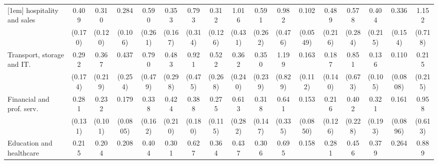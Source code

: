 {\begin{tabular}{l*{16}{c}}
[1em]
hospitality and sales&       0.409\sym{*}  &       0.310\sym{**} &       0.284\sym{***}&       0.590         &       0.353\sym{*}  &       0.793         &       0.312\sym{**} &       1.016         &       0.591         &       0.982         &       0.102\sym{***}&       0.489         &       0.578         &       0.404         &       0.336\sym{*}  &       1.152         \\
                    &     (0.170)         &     (0.120)         &     (0.106)         &     (0.261)         &     (0.167)         &     (0.314)         &     (0.126)         &     (0.431)         &     (0.262)         &     (0.476)         &    (0.0549)         &     (0.216)         &     (0.284)         &     (0.215)         &     (0.154)         &     (0.718)         \\
[1em]
Transport, storage and IT.&       0.292\sym{*}  &       0.367         &       0.437         &       0.790         &       0.483         &       0.921         &       0.522         &       0.362         &       0.350         &       1.199         &       0.163\sym{**} &       0.187\sym{*}  &       0.851         &       0.136\sym{**} &       0.110\sym{**} &       0.215         \\
                    &     (0.174)         &     (0.219)         &     (0.254)         &     (0.479)         &     (0.298)         &     (0.475)         &     (0.268)         &     (0.240)         &     (0.239)         &     (0.829)         &     (0.112)         &     (0.140)         &     (0.673)         &     (0.105)         &    (0.0808)         &     (0.215)         \\
[1em]
Financial and prof. serv.&       0.281\sym{**} &       0.232\sym{***}&       0.179\sym{***}&       0.338\sym{*}  &       0.424         &       0.388\sym{*}  &       0.275\sym{**} &       0.613         &       0.318\sym{*}  &       0.641         &       0.153\sym{***}&       0.216\sym{**} &       0.402         &       0.321         &       0.161\sym{**} &       0.958         \\
                    &     (0.131)         &     (0.101)         &    (0.0805)         &     (0.162)         &     (0.210)         &     (0.180)         &     (0.115)         &     (0.282)         &     (0.147)         &     (0.335)         &    (0.0850)         &     (0.126)         &     (0.228)         &     (0.193)         &    (0.0896)         &     (0.613)         \\
[1em]
Education and healthcare&       0.215\sym{***}&       0.204\sym{***}&       0.208\sym{***}&       0.404\sym{*}  &       0.301\sym{*}  &       0.627         &       0.364\sym{*}  &       0.437         &       0.306\sym{*}  &       0.695         &       0.158\sym{***}&       0.281\sym{*}  &       0.456         &       0.379         &       0.264\sym{*}  &       0.889         \\

\end{tabular}}
